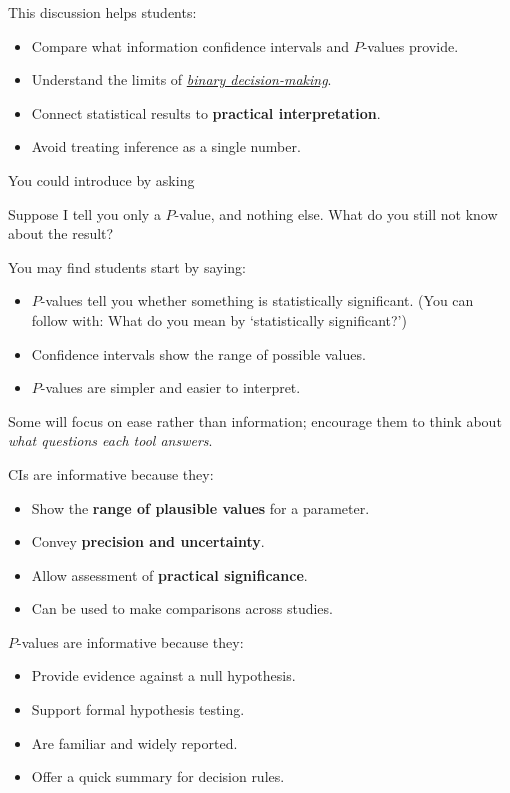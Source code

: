 \documentclass[
  11pt,
  a4paper,
  krantz2]{krantz}
\makeatletter
\providecommand{\tightlist}{%
  \setlength{\itemsep}{0pt}\setlength{\parskip}{0pt}}
\renewenvironment{quote}%
{\begin{kframe}}
{\end{kframe}}
\newenvironment{kframe}{%
\medskip{}
\setlength{\fboxsep}{.8em}
 \def\at@end@of@kframe{}%
 \ifinner\ifhmode%
  \def\at@end@of@kframe{\end{minipage}}%
  \begin{minipage}{\columnwidth}%
 \fi\fi%
 \def\FrameCommand##1{\hskip\@totalleftmargin \hskip-\fboxsep
 \colorbox{shadecolor}{##1}\hskip-\fboxsep
     \hskip-\linewidth \hskip-\@totalleftmargin \hskip\columnwidth}%
 \MakeFramed {\advance\hsize-\width
   \@totalleftmargin\z@ \linewidth\hsize
   \@setminipage}}%
 {\par\unskip\endMakeFramed%
 \at@end@of@kframe}
\renewenvironment{quote}
               {\list{}{\vspace{-0.5em}\begin{kframe}\small%
                        \rightmargin   \leftmargin
                        \parsep        \z@ \@plus\p@}%
                \item\relax}
               {\end{kframe}\endlist}
\makeatother
\begin{document}
This discussion helps students:

\begin{itemize}
\tightlist
\item
  Compare what information confidence intervals and \(P\)-values provide.
\item
  Understand the limits of \href{https://bookdown.org/pkaldunn/SRM-Textbook/MoreAboutTests.html\#AboutPvalues}{\emph{binary decision-making}}.
\item
  Connect statistical results to \textbf{practical interpretation}.
\item
  Avoid treating inference as a single number.
\end{itemize}

You could introduce by asking

\begin{quote}
Suppose I tell you only a \(P\)-value, and nothing else.
What do you still not know about the result?
\end{quote}

You may find students start by saying:

\begin{itemize}
\tightlist
\item
  \(P\)-values tell you whether something is statistically significant.
  (You can follow with: What do you mean by `statistically significant?')
\item
  Confidence intervals show the range of possible values.
\item
  \(P\)-values are simpler and easier to interpret.
\end{itemize}

Some will focus on ease rather than information; encourage them to think about \emph{what questions each tool answers}.

CIs are informative because they:

\begin{itemize}
\tightlist
\item
  Show the \textbf{range of plausible values} for a parameter.
\item
  Convey \textbf{precision and uncertainty}.
\item
  Allow assessment of \textbf{practical significance}.
\item
  Can be used to make comparisons across studies.
\end{itemize}

\(P\)-values are informative because they:

\begin{itemize}
\tightlist
\item
  Provide evidence against a null hypothesis.
\item
  Support formal hypothesis testing.
\item
  Are familiar and widely reported.
\item
  Offer a quick summary for decision rules.
\end{itemize}
\end{document}
